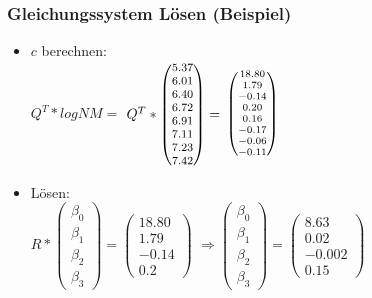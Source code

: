 \documentclass{beamer}
\begin{document}
\begin{frame}
  \frametitle{Gleichungssystem Lösen (Beispiel)}
  \begin{itemize}
  \item $c$ berechnen: \\ 
    $Q^T * log NM = $
    $Q^T * \footnotesize \begin{pmatrix} 5.37 \\ 6.01 \\ 6.40 \\ 6.72 \\ 6.91 \\ 7.11 \\ 7.23 \\ 7.42 \end{pmatrix} = $
    $\scriptsize \begin{pmatrix} 18.80 \\ 1.79 \\ -0.14 \\ 0.20 \\ 0.16 \\ -0.17 \\ -0.06 \\ -0.11 \end{pmatrix}$

    \pause

  \item Lösen: \\
    $R * \begin{pmatrix} \beta_0 \\ \beta_1 \\ \beta_2 \\ \beta_3 \end{pmatrix} = \begin{pmatrix} 18.80 \\ 1.79 \\ -0.14 \\ 0.2 \end{pmatrix}$
    \pause
    $\Rightarrow \begin{pmatrix} \beta_0 \\ \beta_1 \\ \beta_2 \\ \beta_3 \end{pmatrix} = \begin{pmatrix} 8.63 \\ 0.02 \\ -0.002 \\ 0.15 \end{pmatrix}$
  \end{itemize}
  \end{frame}
\end{document}
